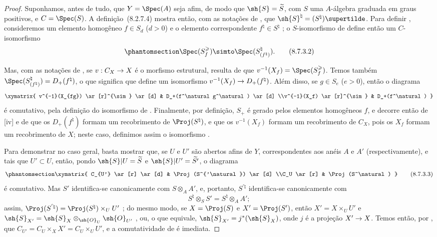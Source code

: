 \documentclass[oneside,10pt]{amsart}
\makeatletter
\renewcommand{\geq}{\geqslant}
\newcommand{\ega@arrow}[2]{\mathchoice{#1}{#2}{#2}{#2}}
\renewcommand{\to}{\ega@arrow{\longrightarrow}{\rightarrow}}
\newcommand{\oldpage}[2][]{\marginnote{\normalfont\footnotesize\textbf{#1}~|~#2}\ignorespaces}
\let\EGAOriginalLabel\label
\renewcommand{\label}[1]{\phantomsection\EGAOriginalLabel{#1}}
\makeatother
\begin{document}
\begin{proof}
Suponhamos, antes de tudo, que $Y=\Spec(A)$ seja afim, de modo que $\sh{S}=\widetilde{S}$, com $S$ uma $A$-álgebra graduada em graus positivos, e $C=\Spec(S)$.
A definição~\textup{(8.2.7.4)} mostra então, com as notações de , que $\sh{S}^\natural=(S^\natural)\supertilde$.
Para definir , consideremos um elemento homogêneo $f\in S_d$ ($d>0$) e o elemento correspondente $f^\natural\in S^\natural$ ;
o $S$-isomorfismo de  define então um $C$-isomorfismo
\[
\label{II.8.7.3.2}
  \Spec(S_f^\geq) \simto \Spec(S_{(f^\natural)}^\natural).
\tag{8.7.3.2}
\]

\oldpage[II]{175}
Mas, com as notações de , se $v:C_X\to X$ é o morfismo estrutural, resulta de  que $v^{-1}(X_f)=\Spec(S_f^\geq)$.
Temos também $\Spec(S_{(f^\natural)}^\natural)=D_+(f^\natural)$, o que significa que  define um isomorfismo $v^{-1}(X_f)\to D_+(f^\natural)$.
Além disso, se $g\in S_e$ ($e>0$), então o diagrama
\[
  \xymatrix{
    v^{-1}(X_{fg})
      \ar[r]^{\sim}
      \ar[d]
  & D_+(f^\natural g^\natural)
      \ar[d]
  \\v^{-1}(X_f)
      \ar[r]^{\sim}
  & D_+(f^\natural)
  }
\]
é comutativo, pela definição do isomorfismo de .
Finalmente, por definição, $S_+$ é gerado pelos elementos homogêneos $f$, e decorre então de [iv] e de  que os $D_+(f^\natural)$ formam um recobrimento de $\Proj(S^\natural)$, e que os $v^{-1}(X_f)$ formam um recobrimento de $C_X$, pois os $X_f$ formam um recobrimento de $X$;
neste caso, definimos assim o isomorfismo .

Para demonstrar  no caso geral, basta mostrar que, se $U$ e $U'$ são abertos afins de $Y$, correspondentes aos anéis $A$ e $A'$ (respectivamente), e tais que $U'\subset U$, então, pondo $\sh{S}|U=\widetilde{S}$ e $\sh{S}|U'=\widetilde{S'}$, o diagrama
\[
\label{II.8.7.3.3}
  \xymatrix{
    C_{U'}
      \ar[r]
      \ar[d]
  & \Proj(S^{'\natural})
      \ar[d]
  \\C_U
      \ar[r]
  & \Proj(S^\natural)
  }
\tag{8.7.3.3}
\]
é comutativo.
Mas $S'$ identifica-se canonicamente com $S\otimes_A A'$, e, portanto, $S^{'\natural}$ identifica-se canonicamente com
\[
  S^\natural \otimes_S S' = S^\natural \otimes_A A';
\]
assim, $\Proj(S^{'\natural}) = \Proj(S^\natural)\times_U U'$ ;
do mesmo modo, se $X=\Proj(S)$ e $X'=\Proj(S')$, então $X'=X\times_U U'$ e $\sh{S}_{X'}=\sh{S}_X\otimes_{\sh{O}_U}\sh{O}_{U'}$ , ou, o que equivale, $\sh{S}_{X'}=j^*(\sh{S}_X)$, onde $j$ é a projeção $X'\to X$.
Temos então, por , que $C_{U'} = C_U\times_X X' = C_U\times_U U'$, e a comutatividade de  é imediata.
\end{proof}
\end{document}
